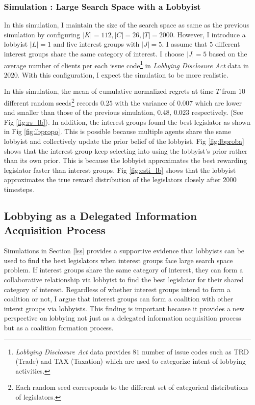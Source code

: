 \documentclass{article}
\begin{document}
\subsubsection{Simulation : Large Search Space with a Lobbyist}

In this simulation, I maintain the size of the search space as same as the previous simulation 
by configuring $|K|=112, |C|=26, |T|=2000$.
However, I introduce a lobbyist $|L|=1$ and five interest groups with $|J|=5$. 
I assume that $5$ different interest groups
share the same category of interest. I choose $|J|=5$ based on the 
average number of clients per each issue code\footnote{
    \textit{Lobbying Disclosure Act} data provides $81$ number of issue codes such as 
    TRD (Trade) and TAX (Taxation) which are used to categorize intent of lobbying activities.
    } in \textit{Lobbying Disclosure Act} data in $2020$.
With this configuration, I expect 
the simulation to be more realistic.

In this simulation, the mean of cumulative normalized regrets at time $T$ from 
$10$ different random seeds\footnote{Each random seed  
corresponds to the different set of categorical distributions of legislators. 
} records $0.25$ with the variance of $0.007$ which are lower and smaller than those of the previous simulation, $0.48$, $0.023$ respectively. 
(See Fig \ref{fig:rs_lb}).
In addition, 
the interest groups found the best legislator as shown in Fig \ref{fig:lbpropo}.  
This is possible because multiple agents 
share the same lobbyist and collectively update 
the prior belief of the lobbyist. 
Fig \ref{fig:lbproba} 
shows that the interest group keep selecting into using 
the lobbyist's prior rather than its own prior. 
This is because
the lobbyist approximates the best rewarding legislator faster than interest groups.
Fig \ref{fig:esti_lb} shows that the lobbyist approximates 
the true reward distribution of the legislators closely after $2000$ timesteps. 
 
\subsection{\large{Lobbying as a Delegated Information Acquisition Process}}

Simulations in Section \ref{lss} 
provides a supportive evidence that 
lobbyists can be used to find the best legislators
when interest groups face large search space problem.
If interest groups share the 
same category of interest, they can form a collaborative
relationship via lobbyist 
to find the best legislator for their shared category of interest.
Regardless of whether interest groups intend to form a coalition or not, 
I argue that interest groups 
can form a coalition with other interst groups 
via lobbyists.
This finding is important 
because it provides a new perspective on 
lobbying not just as a delegated information acquisition process
but as a coalition formation process.
\end{document}
